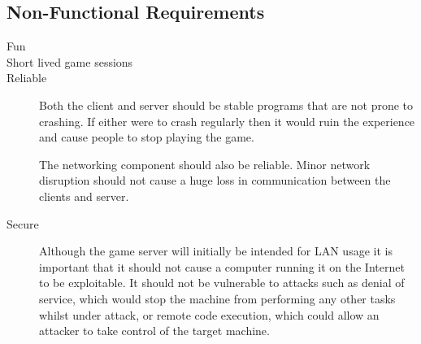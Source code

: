 \subsection{Non-Functional Requirements}

\begin{description}

	\item[Fun]

	\item[Short lived game sessions]

	\item[Reliable]

		Both the client and server should be stable programs that are not prone to
		crashing. If either were to crash regularly then it would ruin the experience
		and cause people to stop playing the game.

		The networking component should also be reliable. Minor network disruption should
		not cause a huge loss in communication between the clients and server.

	\item[Secure]

		Although the game server will initially be intended for LAN usage it is
		important that it should not cause a computer running it on the Internet to be
		exploitable. It should not be vulnerable to attacks such as denial of service,
		which would stop the machine from performing any other tasks whilst under attack,
		or remote code execution, which could allow an attacker to take control of the
		target machine.

\end{description}

